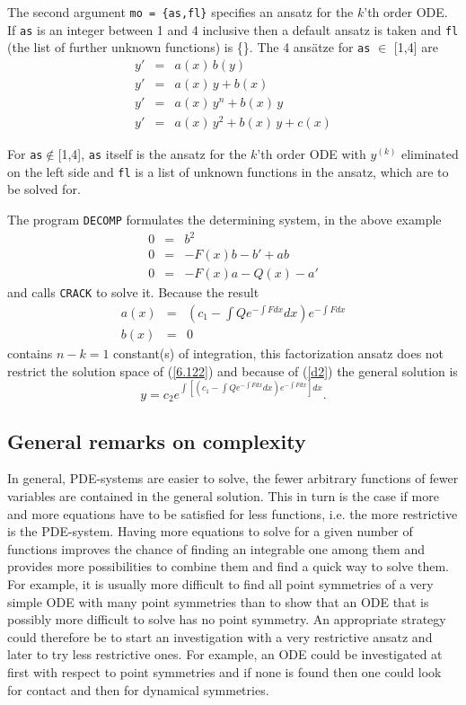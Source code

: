 The second argument {\tt mo = \{as,fl\}} specifies an ansatz for the $k$'th
order ODE. If {\tt as} is an integer between 1 and 4 inclusive 
then a default ansatz 
is taken and {\tt fl} (the list of further unknown functions) is \{\}. 
The 4 ans\"atze for \verb+as+ $\in$ [1,4] are
\begin{eqnarray}
y' & = & a(x)\,b(y)      \nonumber   \\
y' & = & a(x)\,y + b(x)   \label{d2}     \\
y' & = & a(x)\,y^n + b(x)\,y    \nonumber   \\
y' & = & a(x)\,y^2 + b(x)\,y + c(x)      \nonumber
\end{eqnarray}

   For {\tt as}$\not\in$[1,4], {\tt as} itself is the ansatz for the $k$'th
order ODE with $y^{(k)}$ eliminated on the left side and {\tt fl} is 
a list of unknown functions in the ansatz, which are to be solved for.

The program {\tt DECOMP} formulates the determining system, in the above
example 
\begin{eqnarray*}
0 & = & b^2  \\
0 & = & - F(x)b - b' + ab  \\
0 & = & - F(x)a - Q(x) - a'
\end{eqnarray*}
and calls {\tt CRACK} to solve it. Because the result
\begin{eqnarray*}
a(x) & = & \left(c_1 - \int Qe^{-\int F dx} dx\right)e^{-\int F dx} \\
b(x) & = & 0
\end{eqnarray*}
contains $n-k = 1$ constant(s) of integration, this factorization ansatz
does not restrict the solution space  of (\ref{6.122})
and because of (\ref{d2}) the general solution is
\[y = c_2e^{\int \left[\left(c_1 - \int Qe^{-\int F dx} dx\right)e^{-\int F dx}
\right] dx}.\]

\subsection{General remarks on complexity}
In general, PDE-systems are easier to solve, the fewer arbitrary functions of
fewer variables are contained in the general solution. This in turn
is the case if more and more equations have to be satisfied for less functions,
i.e. the more restrictive is the PDE-system.
Having more equations to solve for a given number of functions
improves the
chance of finding an integrable one among them and provides
more possibilities to combine them and find a quick way to solve
them. For example, it is usually more difficult to find all 
point symmetries of a very simple ODE with many point symmetries
than to show that an ODE that is possibly more difficult 
to solve has no point symmetry.
An appropriate strategy could therefore be to start an
investigation with a very restrictive ansatz and later to try
less restrictive ones. For example, an ODE could be investigated at first
with respect to point symmetries and if none is found then one
could look for contact and then for dynamical symmetries.
   
